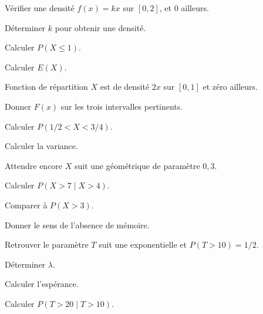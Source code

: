 \begingroup\renewcommand{\otBesoinPlace}[1]{}\begin{minipage}{\linewidth}
\begin{exercice}[2]{Vérifier une densité}
$f(x)=kx$ sur $[0,2]$, et $0$ ailleurs.
\begin{questions}
\item Déterminer $k$ pour obtenir une densité.
\item Calculer $P(X\leq1)$.
\item Calculer $E(X)$.
\end{questions}
\end{exercice}
\begin{exercice}[2]{Fonction de répartition}
$X$ est de densité $2x$ sur $[0,1]$ et zéro ailleurs.
\begin{questions}
\item Donner $F(x)$ sur les trois intervalles pertinents.
\item Calculer $P(1/2<X<3/4)$.
\item Calculer la variance.
\end{questions}
\end{exercice}
\begin{exercice}[2]{Attendre encore}
$X$ suit une géométrique de paramètre $0{,}3$.
\begin{questions}
\item Calculer $P(X>7\mid X>4)$.
\item Comparer à $P(X>3)$.
\item Donner le sens de l’absence de mémoire.
\end{questions}
\end{exercice}
\begin{exercice}[2]{Retrouver le paramètre}
$T$ suit une exponentielle et $P(T>10)=1/2$.
\begin{questions}
\item Déterminer $\lambda$.
\item Calculer l’espérance.
\item Calculer $P(T>20\mid T>10)$.
\end{questions}
\end{exercice}
\end{minipage}\endgroup
\clearpage
{}
